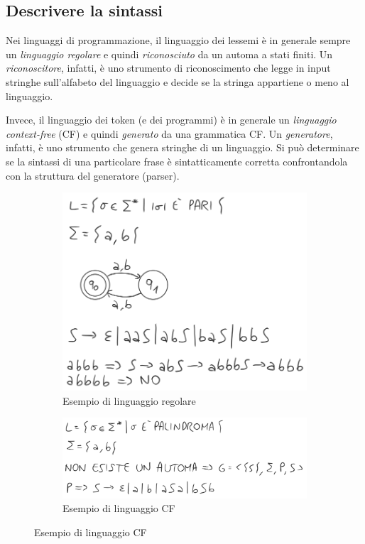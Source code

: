 \documentclass[a4paper,oneside,titlepage]{book}
\begin{document}
\subsection{Descrivere la sintassi}
Nei linguaggi di programmazione, il linguaggio dei lessemi è in generale sempre un \textit{linguaggio regolare} e quindi \textit{riconosciuto} da un automa a stati finiti. Un \textit{riconoscitore}, infatti, è uno strumento di riconoscimento che legge in input stringhe sull'alfabeto del linguaggio e decide se la stringa appartiene o meno al linguaggio.

Invece, il linguaggio dei token (e dei programmi) è in generale un \textit{linguaggio context-free} (CF) e quindi \textit{generato} da una grammatica CF. Un \textit{generatore}, infatti, è uno strumento che genera stringhe di un linguaggio. Si può determinare se la sintassi di una particolare frase è sintatticamente corretta confrontandola con la struttura del generatore (parser).
\begin{figure}[htp]
	\begin{subfigure}{0.49\textwidth}
		\includegraphics[width=\textwidth, height=\textheight, keepaspectratio]{automa.png} 
		\caption{Esempio di linguaggio regolare}
	\end{subfigure}
	\hfill
	\begin{subfigure}{0.49\textwidth}
		\includegraphics[width=\textwidth, height=\textheight, keepaspectratio]{grammatica.png}
		\caption{Esempio di linguaggio CF}
	\end{subfigure}
\end{figure}
\newpage
\end{document}
